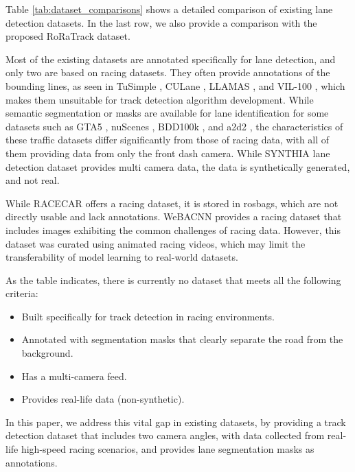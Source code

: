 Table \ref{tab:dataset_comparisons} shows a detailed comparison of existing lane detection datasets. In the last row, we also provide a comparison with the proposed RoRaTrack dataset. %

Most of the existing datasets are annotated specifically for lane detection, and only two are based on racing datasets. They often provide annotations of the bounding lines, as seen in TuSimple \cite{TuSimple}, CULane \cite{CULane}, LLAMAS \cite{llamas}, and VIL-100 \cite{vil100}, which makes them unsuitable for track detection algorithm development. While semantic segmentation or masks are available for lane identification for some datasets such as GTA5 \cite{gta5}, nuScenes \cite{nuscenes}, BDD100k \cite{bdd100k}, and a2d2 \cite{a2d2}, the characteristics of these traffic datasets differ significantly from those of racing data, with all of them providing data from only the front dash camera. While SYNTHIA \cite{synthia} lane detection dataset provides multi camera data, the data is synthetically generated, and not real.

While RACECAR \cite{racecar} offers a racing dataset, it is stored in rosbags, which are not directly usable and lack annotations. WeBACNN \cite{ghosh2024weighted} provides a racing dataset that includes images exhibiting the common challenges of racing data. However, this dataset was curated using animated racing videos, which may limit the transferability of model learning to real-world datasets. 

As the table indicates, there is currently no dataset that meets all the following criteria:
\begin{itemize}
    \item Built specifically for track detection in racing environments.
    \item Annotated with segmentation masks that clearly separate the road from the background.
    \item Has a multi-camera feed.
    \item Provides real-life data (non-synthetic).
\end{itemize}
In this paper, we address this vital gap in existing datasets, by providing a track detection dataset that includes two camera angles, with data collected from real-life high-speed racing scenarios, and provides lane segmentation masks as annotations.